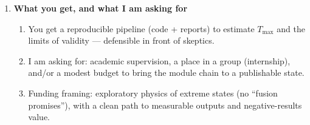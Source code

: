 \documentclass[11pt]{article}
\begin{document}
\begin{enumerate}
\begin{enumerate}
\[			\qquad
			\sigma_{\mathrm{abs}}(\lambda,a)=k\,\Im\!\bigl(\alpha(\lambda)\bigr),
			\quad
			k=\frac{2\pi n_m}{\lambda}.
			\]
			Heat/source term example:\\
			\[
			\dot Q_{\mathrm{src}}(t)=N_{\mathrm{np}}\;\sigma_{\mathrm{abs}}(\lambda,a)\;I(t),
			\]
			with laser intensity $I(t)$ and number of nanoparticles $N_{\mathrm{np}}$.\\
			Coupling example (schematic boundary heat transfer to gas region):\\
			\[
			\dot Q_{\mathrm{couple}}(t)=4\pi R^{2}\,h(t)\,\bigl(T_{\mathrm{np}}(t)-T_g(t)\bigr),
			\]
			where $h(t)$ is an effective heat-transfer coefficient.]
			\item Reality-control block: energy-balance checks, timescale comparisons (laser pulse duration vs collapse time), and sensitivity to uncertain parameters.
		\end{enumerate}
		
		\item \textbf{What you get, and what I am asking for}
		\begin{enumerate}
			\item You get a reproducible pipeline (code + reports) to estimate $T_{\max}$ and the limits of validity --- defensible in front of skeptics.
			\item I am asking for: academic supervision, a place in a group (internship), and/or a modest budget to bring the module chain to a publishable state.
			\item Funding framing: exploratory physics of extreme states (no ``fusion promises''), with a clean path to measurable outputs and negative-results value.
		\end{enumerate}
		
	\end{enumerate}
	
\end{document}
